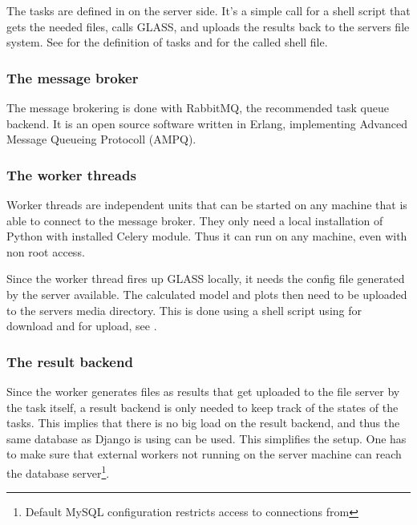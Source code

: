 
The tasks are defined in  on the server side.
It's a simple call for a shell script that gets the needed files, calls GLASS, and uploads the results back to the servers file system.
See  for the definition of tasks and  for the called shell file.



\subsubsection{The message broker}

The message brokering is done with RabbitMQ, the recommended task queue backend.
It is an open source software written in Erlang, implementing Advanced Message Queueing Protocoll (AMPQ).

\subsubsection{The worker threads}

Worker threads are independent units that can be started on any machine that is able to connect to the message broker. They only need a local installation of Python with installed Celery module.
Thus it can run on any machine, even with non root access.

Since the worker thread fires up GLASS locally, it needs the config file generated by the server available.
The calculated model and plots then need to be uploaded to the servers media directory.
This is done using a shell script using  for download and  for upload, see .




\subsubsection{The result backend}
Since the worker generates files as results that get uploaded to the file server by the task itself, a result backend is only needed to keep track of the states of the tasks.
This implies that there is no big load on the result backend, and thus the same database as Django is using can be used. This simplifies the setup.
One has to make sure that external workers not running on the server machine can reach the database server\footnote{Default MySQL configuration restricts access to connections from }.




